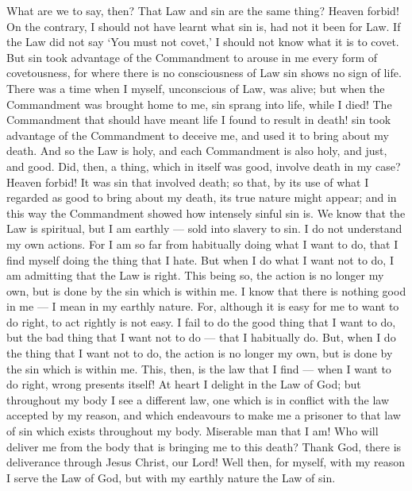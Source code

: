  What are we to say, then? That Law and sin are the same
thing? Heaven forbid! On the contrary, I should not have learnt what sin
is, had not it been for Law. If the Law did not say `You must not
covet,' I should not know what it is to covet.  But sin took
advantage of the Commandment to arouse in me every form of covetousness,
for where there is no consciousness of Law sin shows no sign of life.
 There was a time when I myself, unconscious of Law, was
alive; but when the Commandment was brought home to me, sin sprang into
life, while I died!  The Commandment that should have meant
life I found to result in death!  sin took advantage of the
Commandment to deceive me, and used it to bring about my death.
 And so the Law is holy, and each Commandment is also holy,
and just, and good.  Did, then, a thing, which in itself
was good, involve death in my case? Heaven forbid! It was sin that
involved death; so that, by its use of what I regarded as good to bring
about my death, its true nature might appear; and in this way the
Commandment showed how intensely sinful sin is.  We know
that the Law is spiritual, but I am earthly --- sold into slavery to
sin.  I do not understand my own actions. For I am so far
from habitually doing what I want to do, that I find myself doing the
thing that I hate.  But when I do what I want not to do, I
am admitting that the Law is right.  This being so, the
action is no longer my own, but is done by the sin which is within me.
 I know that there is nothing good in me --- I mean in my
earthly nature. For, although it is easy for me to want to do right, to
act rightly is not easy.  I fail to do the good thing that
I want to do, but the bad thing that I want not to do --- that I
habitually do.  But, when I do the thing that I want not to
do, the action is no longer my own, but is done by the sin which is
within me.  This, then, is the law that I find --- when I
want to do right, wrong presents itself!  At heart I
delight in the Law of God;  but throughout my body I see a
different law, one which is in conflict with the law accepted by my
reason, and which endeavours to make me a prisoner to that law of sin
which exists throughout my body.  Miserable man that I am!
Who will deliver me from the body that is bringing me to this death?
 Thank God, there is deliverance through Jesus Christ, our
Lord! Well then, for myself, with my reason I serve the Law of God, but
with my earthly nature the Law of sin.

